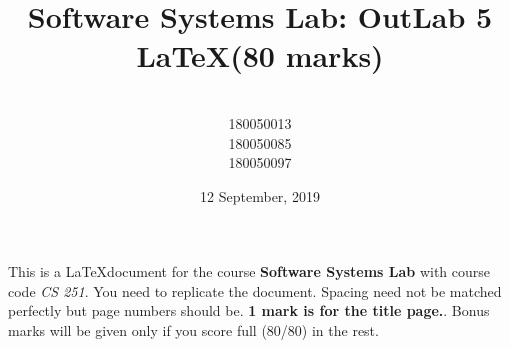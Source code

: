 \documentclass[a4paper, 11pt]{article}
\title{ \huge \textbf{ Software Systems Lab: OutLab 5}\\
\huge \textbf{\LaTeX (80 marks)}}
\author{\Large \text{Code Warriors}\\
\normalsize 180050013\\
\normalsize 180050085\\
\normalsize 180050097\\
}
\date{12 September, 2019 }
\begin{document}
\maketitle


% 
% 
% 
% 
% 
%     
%
%      
%      
%      

\newpage

\tableofcontents
{}
\newpage

This is a \LaTeX document for the course \textbf{Software Systems Lab} with course code \textsl{CS 251}. You need to replicate the document. Spacing need not be matched perfectly but page numbers should be. \textbf{1 mark is for the title page.}. Bonus marks will be given only if you score full (80/80) in the rest.
\end{document}
